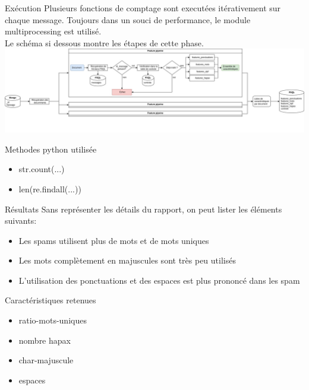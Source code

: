 \documentclass[xelatex,11pt, xcolor=dvipsnames]{beamer}
\begin{document}
\begin{frame}{Exécution}
	Plusieurs fonctions de comptage sont executées itérativement sur chaque message.
	Toujours dans un souci de performance, le module multiprocessing est utilisé.\\

	Le schéma si dessous montre les étapes de cette phase.
	\includegraphics[width=\linewidth]{img/features}
	\begin{block}{Methodes python utilisée}
		\begin{itemize}
			\item str.count(...)
			\item len(re.findall(...))
		\end{itemize}
	\end{block}
\end{frame}

\begin{frame}{Résultats}
	Sans représenter les détails du rapport, on peut lister les éléments suivants:
	\begin{itemize}
		\item Les spams utilisent plus de mots et de mots uniques
		\item Les mots complètement en majuscules sont très peu utilisés
		\item L'utilisation des ponctuations et des espaces est plus prononcé dans les spam
	\end{itemize}
	\begin{block}{Caractéristiques retenues}
		\begin{itemize}
			\item ratio-mots-uniques
			\item nombre hapax
			\item char-majuscule
			\item espaces
		\end{itemize}
	\end{block}
\end{frame}
\end{document}
